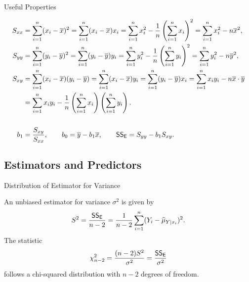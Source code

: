 \begin{frame}{Useful Properties}

\justifying
{}
\footnotesize
\begin{align*}
S_{xx} & = \sum_{i=1}^n (x_i - \overline{x})^2 = \sum_{i=1}^n (x_i - \overline{x})x_i = \sum_{i=1}^n x_i^2 - \frac{1}{n}\left(\sum_{i=1}^n x_i\right)^2  = \sum_{i=1}^n x_i^2 - n\overline{x}^2, \\
S_{yy} & = \sum_{i=1}^n (y_i - \overline{y})^2 = \sum_{i=1}^n (y_i - \overline{y})y_i = \sum_{i=1}^n y_i^2 - \frac{1}{n}\left(\sum_{i=1}^n y_i\right)^2 = \sum_{i=1}^n y_i^2 - n\overline{y}^2, \\
S_{xy} & = \sum_{i=1}^n (x_i - \overline{x})(y_i - \overline{y}) = \sum_{i=1}^n (x_i - \overline{x})y_i = \sum_{i=1}^n (y_i - \overline{y})x_i = \sum_{i=1}^n x_iy_i - n\overline{x}\cdot\overline{y} \\
& = \sum_{i=1}^n x_iy_i - \frac{1}{n}\left(\sum_{i=1}^n x_i \right)\left(\sum_{i=1}^n y_i \right). \\\\
b_1 & = \frac{S_{xy}}{S_{xx}}, \qquad b_0 = \overline{y} - b_1\overline{x},\qquad \mathsf{SS_E} = S_{yy} - b_1 S_{xy}.
\end{align*}

\end{frame}

\subsection{Estimators and Predictors}

\begin{frame}{Distribution of Estimator for Variance}

 An unbiased estimator for variance $\sigma^2$ is given by
\begin{align*}
S^2 = \frac{\mathsf{SS_E}}{n-2} = \frac{1}{n-2}\sum_{i=1}^n (Y_i-\widehat{\mu}_{Y|x_i})^2.
\end{align*}
 The statistic
\begin{align*}
\chi_{n-2}^2 = \frac{(n-2)S^2}{\sigma^2} = \frac{\mathsf{SS_E}}{\sigma^2}
\end{align*}
follows a chi-squared distribution with $n-2$ degrees of freedom.

\end{frame}

